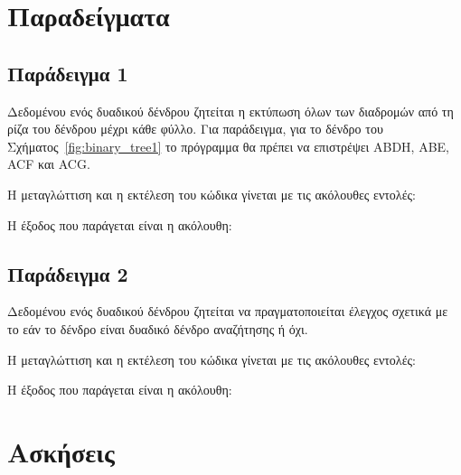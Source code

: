\section{Παραδείγματα}

\subsection{Παράδειγμα 1}

Δεδομένου ενός δυαδικού δένδρου ζητείται η εκτύπωση όλων των διαδρομών από τη ρίζα του δένδρου μέχρι κάθε φύλλο. Για παράδειγμα, για το δένδρο του Σχήματος~\ref{fig:binary_tree1} το πρόγραμμα θα πρέπει να επιστρέψει ABDH, ABE, ACF και ACG.



Η μεταγλώττιση και η εκτέλεση του κώδικα γίνεται με τις ακόλουθες εντολές:



Η έξοδος που παράγεται είναι η ακόλουθη:




\subsection{Παράδειγμα 2}

Δεδομένου ενός δυαδικού δένδρου ζητείται να πραγματοποιείται έλεγχος σχετικά με το εάν το δένδρο είναι δυαδικό δένδρο αναζήτησης ή όχι. 



Η μεταγλώττιση και η εκτέλεση του κώδικα γίνεται με τις ακόλουθες εντολές:



Η έξοδος που παράγεται είναι η ακόλουθη:



\section{Ασκήσεις}


